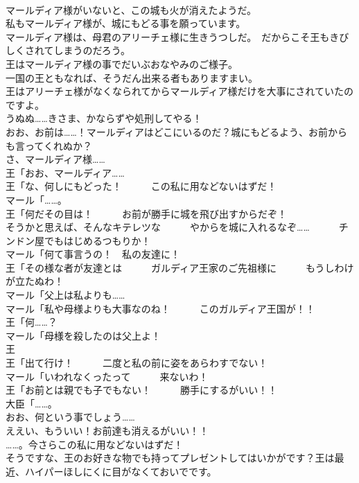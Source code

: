 \documentclass[8pt]{extreport}
\begin{document}
\begin{CJK}{UTF8}{min}
\\	マールディア様がいないと、この城も火が消えたようだ。	
\\	私もマールディア様が、城にもどる事を願っています。	
\\	マールディア様は、母君のアリーチェ様に生きうつしだ。　だからこそ王もきびしくされてしまうのだろう。	
\\	王はマールディア様の事でだいぶおなやみのご様子。 
\\	一国の王ともなれば、そうだん出来る者もありますまい。	
\\	王はアリーチェ様がなくなられてからマールディア様だけを大事にされていたのですよ。	
\\	うぬぬ……きさま、かならずや処刑してやる！	
\\	おお、お前は……！マールディアはどこにいるのだ？城にもどるよう、お前からも言ってくれぬか？	
\\	さ、マールディア様……	
\\	王「おお、マールディア……	
\\	王「な、何しにもどった！　　　この私に用などないはずだ！	
\\	マール「……。	
\\	王「何だその目は！　　　お前が勝手に城を飛び出すからだぞ！	
\\	そうかと思えば、そんなキテレツな　　　やからを城に入れるなぞ……　　　チンドン屋でもはじめるつもりか！	
\\	マール「何て事言うの！　私の友達に！	
\\	王「その様な者が友達とは　　　ガルディア王家のご先祖様に　　　もうしわけが立たぬわ！	
\\	マール「父上は私よりも……	
\\	マール「私や母様よりも大事なのね！　　　このガルディア王国が！！	
\\	王「何……？	
\\	マール「母様を殺したのは父上よ！	
\\	王
\\	王「出て行け！　　　二度と私の前に姿をあらわすでない！	
\\	マール「いわれなくったって　　　来ないわ！	
\\	王「お前とは親でも子でもない！　　　勝手にするがいい！！	
\\	大臣「……。	
\\	おお、何という事でしょう…… 
\\	ええい、もういい！お前達も消えるがいい！！	
\\	……。今さらこの私に用などないはずだ！	
\\	そうですな、王のお好きな物でも持ってプレゼントしてはいかがです？王は最近、ハイパーほしにくに目がなくておいでです。	

\end{CJK}
\end{document}
